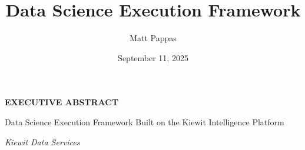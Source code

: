 \documentclass[12pt, a4paper]{article}
\title{Data Science Execution Framework}
\author{Matt Pappas}
\date{September 11, 2025}
\begin{document}
\begin{center}

    \vspace{0.5em}

    {\LARGE \bfseries \MakeUppercase{Executive Abstract} \par}

    \vspace{0.25em}

    {\small Data Science Execution Framework Built on the Kiewit Intelligence Platform}

    \vspace{0.25em}

    {\small \emph{Kiewit Data Services}}

    \vspace{0.5em}
    
\end{center}
\end{document}
